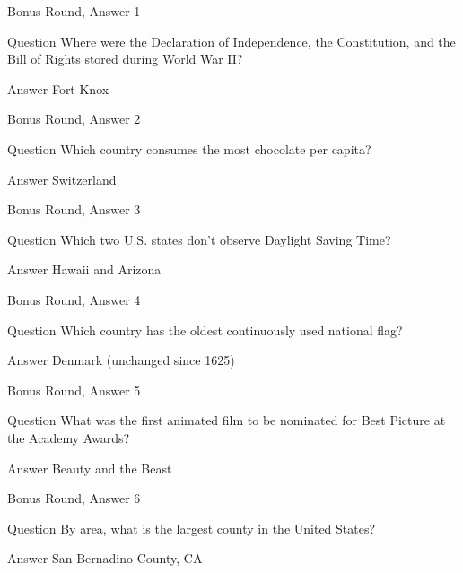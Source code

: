 \documentclass[11pt]{beamer}
\begin{document}
\begin{frame}{Bonus Round, Answer 1}
\begin{block}{Question}
Where were the Declaration of Independence, the Constitution, and the Bill of Rights stored during World War II\@?
\end{block}
\pause{}
\begin{block}{Answer}
Fort Knox
\end{block}
\end{frame}
    

\begin{frame}{Bonus Round, Answer 2}
\begin{block}{Question}
Which country consumes the most chocolate per capita\@?
\end{block}
\pause{}
\begin{block}{Answer}
Switzerland
\end{block}
\end{frame}
    

\begin{frame}{Bonus Round, Answer 3}
\begin{block}{Question}
Which two U.S. states don't observe Daylight Saving Time\@?
\end{block}
\pause{}
\begin{block}{Answer}
Hawaii and Arizona
\end{block}
\end{frame}
    

\begin{frame}{Bonus Round, Answer 4}
\begin{block}{Question}
Which country has the oldest continuously used national flag\@?
\end{block}
\pause{}
\begin{block}{Answer}
Denmark (unchanged since 1625)
\end{block}
\end{frame}
    

\begin{frame}{Bonus Round, Answer 5}
\begin{block}{Question}
What was the first animated film to be nominated for Best Picture at the Academy Awards\@?
\end{block}
\pause{}
\begin{block}{Answer}
Beauty and the Beast
\end{block}
\end{frame}
    

\begin{frame}{Bonus Round, Answer 6}
\begin{block}{Question}
By area, what is the largest county in the United States\@?
\end{block}
\pause{}
\begin{block}{Answer}
San Bernadino County, CA
\end{block}
\end{frame}
    
\end{document}
